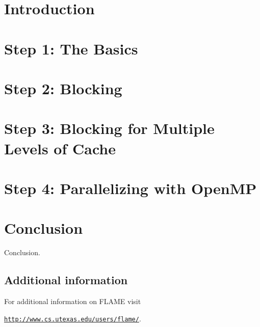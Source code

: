 \section{Introduction}
\label{sec:introduction}



\section{Step 1: The Basics}



\section{Step 2: Blocking}



\section{Step 3: Blocking for Multiple Levels of Cache}



\section{Step 4: Parallelizing with OpenMP}






\section{Conclusion}
\label{sec:conclusion}

Conclusion.


\subsection*{Additional information}

For additional information on FLAME visit
\begin{center}
\href{http://www.cs.utexas.edu/users/flame/}
     {\tt http://www.cs.utexas.edu/users/flame/}.
\end{center}

